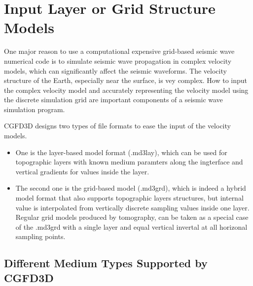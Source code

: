 
\chapter{Input Layer or Grid Structure Models}\label{chapter-media}


One major reason to use a computational expensive grid-based seismic wave numerical code
is to simulate seismic wave propagation in complex velocity models,
which can significantly affect the seismic waveforms.
The velocity structure of the Earth, especially near the surface, is vey complex.
How to input the complex velocity model and accurately representing 
the velocity model using the discrete simulation grid are important
components of a seismic wave simulation program.

CGFD3D designs two types of file formats to ease the input of the velocity models.
\begin{itemize}
  \item One is the layer-based model format (.md3lay),
which can be used for topographic layers with known medium paramters along the ingterface and vertical gradients for values inside the layer.
  \item The second one is the grid-based model (.md3grd), which is indeed a hybrid model format that also supports topographic layers structures,
but internal value is interpolated from vertically discrete sampling values inside one layer.
Regular grid models produced by tomography, can be taken as a special case of the .md3grd 
with a single layer and equal vertical invertal at all horizonal sampling points.
\end{itemize}


\section{Different Medium Types Supported by CGFD3D} \label{sec_medium_type} 

